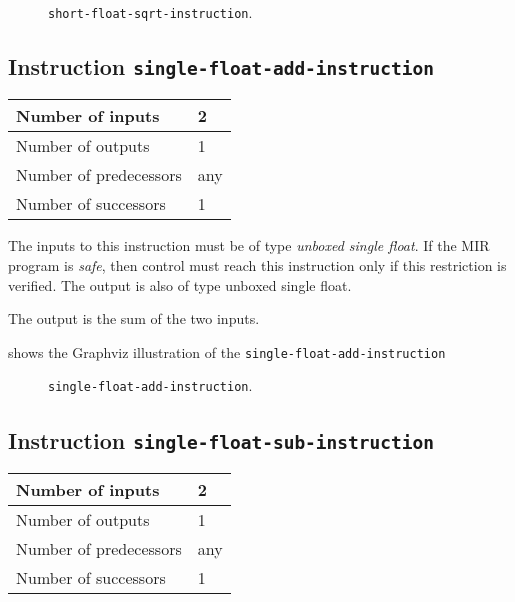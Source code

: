 \begin{figure}
\begin{center}
\end{center}
\caption{\label{fig-short-float-sqrt-instruction}
\texttt{short-float-sqrt-instruction}.}
\end{figure}

\subsection{Instruction \texttt{single-float-add-instruction}}
\label{mir-instruction-single-float-add}

\begin{tabular}{|l|l|}
\hline
Number of inputs & 2\\
\hline
Number of outputs & 1\\
\hline
Number of predecessors & any\\
\hline
Number of successors & 1\\
\hline
\end{tabular}

The inputs to this instruction must be of type \emph{unboxed single
  float}.  If the MIR program is \emph{safe}, then control must reach
this instruction only if this restriction is verified.  The output is
also of type unboxed single float.

The output is the sum of the two inputs.

 shows the Graphviz illustration of the
\texttt{single-float-add-instruction}

\begin{figure}
\begin{center}
\end{center}
\caption{\label{fig-single-float-add-instruction}
\texttt{single-float-add-instruction}.}
\end{figure}

\subsection{Instruction \texttt{single-float-sub-instruction}}
\label{mir-instruction-single-float-sub}

\begin{tabular}{|l|l|}
\hline
Number of inputs & 2\\
\hline
Number of outputs & 1\\
\hline
Number of predecessors & any\\
\hline
Number of successors & 1\\
\hline
\end{tabular}

